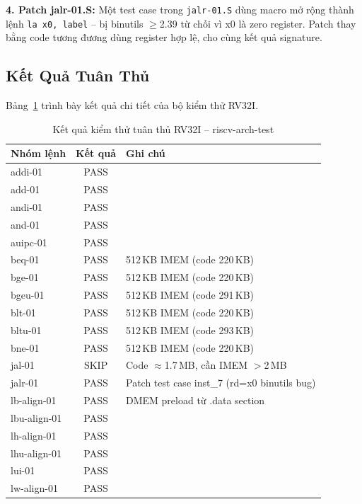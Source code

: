 \textbf{4. Patch jalr-01.S:} Một test case trong \texttt{jalr-01.S} dùng macro mở rộng thành lệnh \texttt{la x0, label} -- bị binutils $\geq$2.39 từ chối vì x0 là zero register. Patch thay bằng code tương đương dùng register hợp lệ, cho cùng kết quả signature.

\subsection{Kết Quả Tuân Thủ}

Bảng~\ref{tab:compliance-results} trình bày kết quả chi tiết của bộ kiểm thử RV32I.

\begin{table}[htbp]
\caption{Kết quả kiểm thử tuân thủ RV32I -- riscv-arch-test}
\label{tab:compliance-results}
\begin{center}
\begin{tabular}{|l|c|l|}
\hline
\textbf{Nhóm lệnh} & \textbf{Kết quả} & \textbf{Ghi chú} \\ \hline
addi-01 & PASS & \\ \hline
add-01 & PASS & \\ \hline
andi-01 & PASS & \\ \hline
and-01 & PASS & \\ \hline
auipc-01 & PASS & \\ \hline
beq-01 & PASS & 512\,KB IMEM (code 220\,KB) \\ \hline
bge-01 & PASS & 512\,KB IMEM (code 220\,KB) \\ \hline
bgeu-01 & PASS & 512\,KB IMEM (code 291\,KB) \\ \hline
blt-01 & PASS & 512\,KB IMEM (code 220\,KB) \\ \hline
bltu-01 & PASS & 512\,KB IMEM (code 293\,KB) \\ \hline
bne-01 & PASS & 512\,KB IMEM (code 220\,KB) \\ \hline
jal-01 & SKIP & Code $\approx$1.7\,MB, cần IMEM $>$2\,MB \\ \hline
jalr-01 & PASS & Patch test case inst\_7 (rd=x0 binutils bug) \\ \hline
lb-align-01 & PASS & DMEM preload từ .data section \\ \hline
lbu-align-01 & PASS & \\ \hline
lh-align-01 & PASS & \\ \hline
lhu-align-01 & PASS & \\ \hline
lui-01 & PASS & \\ \hline
lw-align-01 & PASS & \\ \hline

\end{tabular}
\end{center}
\end{table}

